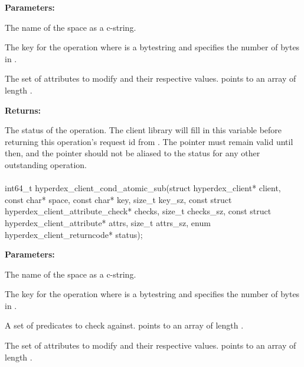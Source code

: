\noindent\textbf{Parameters:}
\begin{description}[labelindent=\widthof{{\code{attrs}, \code{attrs\_sz}}},leftmargin=*,noitemsep,nolistsep,align=right]
\item[\code{space}] The name of the space as a c-string.
\item[\code{key}, \code{key\_sz}] The key for the operation where  is a bytestring and  specifies the number of bytes in .
\item[\code{attrs}, \code{attrs\_sz}] The set of attributes to modify and their respective values.   points to an array of length .
\end{description}

\noindent\textbf{Returns:}
\begin{description}[labelindent=\widthof{{\code{status}}},leftmargin=*,noitemsep,nolistsep,align=right]
\item[\code{status}] The status of the operation.  The client library will fill in this variable before returning this operation's request id from .  The pointer must remain valid until then, and the pointer should not be aliased to the status for any other outstanding operation.
\end{description}

\paragraph{}
\label{api:c:cond_atomic_sub}
\begin{ccode}
int64_t hyperdex_client_cond_atomic_sub(struct hyperdex_client* client,
                const char* space,
                const char* key, size_t key_sz,
                const struct hyperdex_client_attribute_check* checks, size_t checks_sz,
                const struct hyperdex_client_attribute* attrs, size_t attrs_sz,
                enum hyperdex_client_returncode* status);
\end{ccode}
\funcdesc 

\noindent\textbf{Parameters:}
\begin{description}[labelindent=\widthof{{\code{checks}, \code{checks\_sz}}},leftmargin=*,noitemsep,nolistsep,align=right]
\item[\code{space}] The name of the space as a c-string.
\item[\code{key}, \code{key\_sz}] The key for the operation where  is a bytestring and  specifies the number of bytes in .
\item[\code{checks}, \code{checks\_sz}] A set of predicates to check against.   points to an array of length .
\item[\code{attrs}, \code{attrs\_sz}] The set of attributes to modify and their respective values.   points to an array of length .
\end{description}

